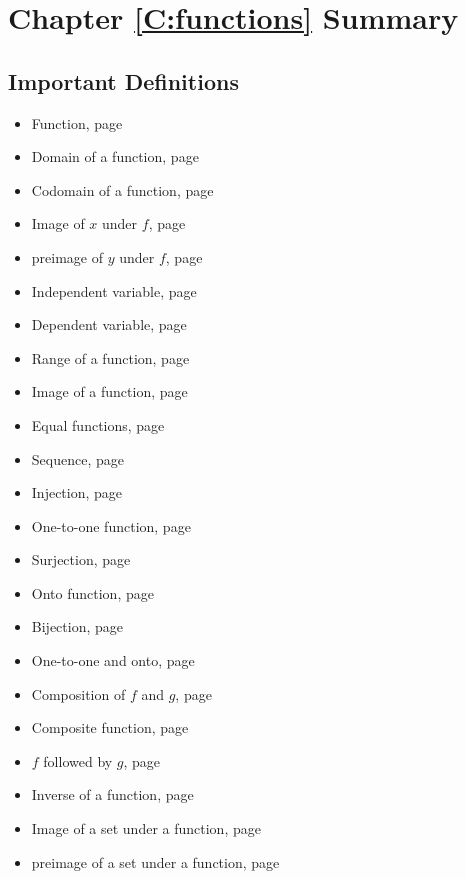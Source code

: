 \section{Chapter \ref{C:functions} Summary} \label{Su:functions}

\subsection*{Important Definitions}
\begin{multicols}{2}
\begin{itemize}
\item Function, page~\pageref*{function}
\item Domain of a function, page~\pageref*{domainfunction}
\item Codomain of a function, page~\pageref*{domainfunction}
\item Image of $x$ under $f$, page~\pageref*{domainfunction}
\item preimage of $y$ under $f$, page~\pageref*{domainfunction}
\item Independent variable, page~\pageref*{domainfunction}
\item Dependent variable, page~\pageref*{domainfunction}
\item Range of a function, page~\pageref*{rangeandimage}
\item Image of a function, page~\pageref*{rangeandimage}
\item Equal functions, page~\pageref*{functionequality}
\item Sequence, page~\pageref*{sequence}
\item Injection, page~\pageref*{injection}
\item One-to-one function, page~\pageref*{injection}
\item Surjection, page~\pageref*{surjection}
\item Onto function, page~\pageref*{surjection}
\item Bijection, page~\pageref*{bijection}
\item One-to-one and onto, page~\pageref*{bijection}
\item Composition of $f$ and $g$, page~\pageref*{functioncomposition}
\item Composite function, page~\pageref*{functioncomposition}
\item $f$ followed by $g$, page~\pageref*{functioncomposition}
\item Inverse of a function, page~\pageref*{inversefunction}
\item Image of a set under a function, page~\pageref*{imageofA}
\item preimage of a set under a function, page~\pageref*{inverseimage}
\end{itemize}
\end{multicols}



